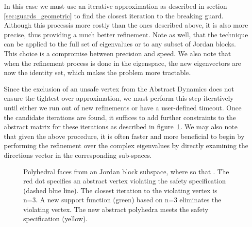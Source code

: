 \documentclass{IEEEtran}
\begin{document}
{\begin{enumerate}
In this case we must use an iterative approximation as described in section \ref{sec:guards_geometric} to find the closest iteration to the breaking guard. Although this processis more costly than the ones described above, it is also more precise, thus providing a much better refinement. Note as well, that the technique can be applied to the full set of eigenvalues or to any subset of Jordan blocks. This choice is a compromise between precision and speed. We also note that when the refinement process is done in the eigenspace, the new eigenvectors are now the identity set, which makes the problem more tractable. 
\end{enumerate}
Since the exclusion of an unsafe vertex from the Abstract Dynamics does not ensure the tightest over-approximation, 
we must perform this step iteratively until either we run out of new refinements or have a user-defined timeout.
Once the candidate iterations are found, it suffices to add further constraints to the abstract matrix for these iterations as described in figure~\ref{fig:cegar_jordan_supports}.
We may also note that given the above procedure, it is often faster and more beneficial to begin by 
performing the refinement over the complex eigenvalues by directly examining the directions vector  
in the corresponding sub-spaces.
\begin{figure}[]
\centering
{}
\caption{Polyhedral faces from an  Jordan block subspace, where 
   so that .
The red dot specifies an abstract vertex violating the safety specification (dashed blue line).
The closest iteration to the violating vertex is n=3.
A new support function (green) based on n=3 eliminates the violating vertex.
The new abstract polyhedra meets the safety specification (yellow).}
\label{fig:cegar_jordan_supports}
\end{figure}
}
\end{document}
